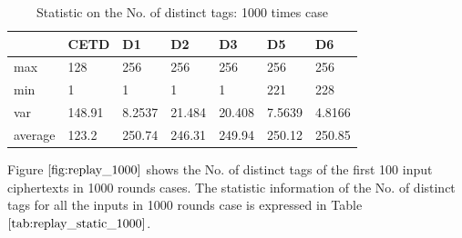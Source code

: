 \documentclass{article}
\begin{document}
\begin{table}[htbp]  
  \centering
  \caption{Statistic on the No. of distinct tags: 1000 times case}
    \begin{tabular}{l|l|l|l|l|l|l}
    \toprule
          & CETD  & D1    & D2    & D3    & D5    & D6 \\
    \midrule
    max   & 128   & 256   & 256   & 256   & 256   & 256 \\
    min   & 1     & 1     & 1     & 1     & 221   & 228 \\
    var   & 148.91 & 8.2537 & 21.484 & 20.408 & 7.5639 & 4.8166 \\
    average & 123.2 & 250.74 & 246.31 & 249.94 & 250.12 & 250.85 \\
    \bottomrule
    \end{tabular}%
\label{tab:replay_static_1000}%
\end{table}%
Figure $\ref{fig:replay_1000}$ shows the No. of distinct tags of the first 100 input ciphertexts in 1000 rounds cases. The statistic information of the No. of distinct tags for all the inputs in 1000 rounds case is expressed in Table $\ref{tab:replay_static_1000}$.
\end{document}
